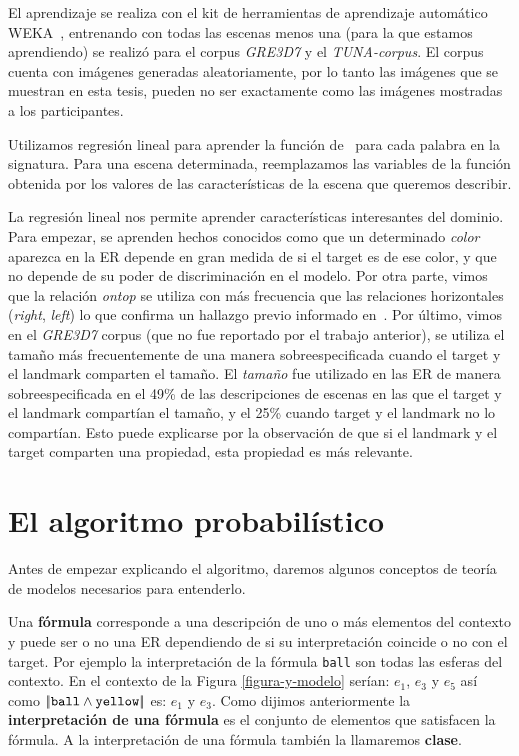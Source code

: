 El aprendizaje se realiza con el kit de herramientas de aprendizaje autom\'atico
WEKA~\cite{Hall:WEK09}, entrenando con todas las escenas menos una (para la que estamos aprendiendo) se realiz\'o para el corpus \textit{GRE3D7} y el \textit{TUNA-corpus}. El corpus cuenta con im\'agenes generadas aleatoriamente, por lo tanto las im\'agenes que se muestran en esta tesis, pueden no ser exactamente como las im\'agenes mostradas a los participantes.

Utilizamos regresi\'on lineal para aprender la funci\'on de
\puse\ para cada palabra en la signatura. Para una escena determinada, reemplazamos
las variables de la funci\'on obtenida por los valores de las caracter\'{i}sticas
de la escena que queremos describir.

La regresi\'on lineal nos permite aprender caracter\'{i}sticas interesantes
 del dominio. Para empezar, se aprenden hechos conocidos
como que un determinado {\it color} aparezca en la ER depende en gran medida de si el
target es de ese color, y que no depende de su
poder de discriminaci\'on en el modelo. Por otra parte, vimos que la relaci\'on {\it ontop}
 se utiliza con m\'as frecuencia que las relaciones horizontales
({\it right}, {\it left}) lo que confirma un hallazgo previo informado
en~\cite{viet:gene11}. Por \'ultimo, vimos en el
\textit{GRE3D7} corpus (que no fue reportado por el trabajo anterior), se utiliza el tama\~no
m\'as frecuentemente de una manera sobreespecificada cuando el
target y el landmark comparten el tama\~no. El {\it tama\~no} fue utilizado en las ER de manera sobreespecificada en el 49\% de
las descripciones de escenas en las que el target y el landmark compart\'ian el tama\~no,
y el 25\% cuando target y el landmark no lo compart\'ian. Esto puede explicarse por la observaci\'on de que si el landmark y el target comparten una propiedad, esta propiedad es m\'as relevante.

\section{El algoritmo probabil\'istico}
\label{sec:algoritmo_probabilistico}
Antes de empezar explicando el algoritmo, daremos algunos conceptos de teor\'ia de modelos necesarios para entenderlo.

Una \textbf{f\'ormula} corresponde a una descripci\'on de uno o m\'as elementos del contexto y puede ser o no una ER dependiendo de 
si su interpretaci\'on coincide o no con el target. Por ejemplo la interpretaci\'on de la f\'ormula \texttt{ball} son todas las esferas 
del contexto. En el contexto de la Figura \ref{figura-y-modelo} ser\'ian: $e_1$, $e_3$ y $e_5$  as\'i como $|\!|\texttt{ball} \land \texttt{yellow}|\!|$ es: $e_1$ y $e_3$.
Como dijimos anteriormente la \textbf{interpretaci\'on de una f\'ormula} es el conjunto de elementos que satisfacen la f\'ormula. A la interpretaci\'on de una f\'ormula tambi\'en la llamaremos \textbf{clase}.

